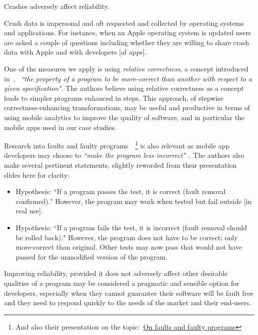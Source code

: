 Crashes adversely affect reliability.



Crash data is impersonal and oft requested and collected by operating systems and applications. For instance, when an Apple operating system is updated users are asked a couple of questions including whether they are willing to share crash data with Apple and with developers [of apps].

One of the measures we apply is using \emph{relative correctness}, a concept introduced in~\cite{diallo2015_correctness_and_relative_correctness}, ~\emph{``the
property of a program to be more-correct than another with respect to a given specification"}. The authors believe using relative correctness as a concept leads to simpler programs enhanced  in steps. This approach, of stepwise correctness-enhancing transformations, may be useful and productive in terms of using mobile analytics to improve the quality of software, and in particular the mobile apps used in our case studies. 

Research into faults and faulty programs~\cite{mili2014_on_faults_and_faulty_programs}~\footnote{And also their presentation on the topic:~\href{http://mathcs.chapman.edu/ramics2014/slides/MiliFriasJaouaRAMiCS2014.pdf}{On faults and faulty programs}} is also relevant as mobile app developers may choose to \emph{``make the program less incorrect"}~\cite{mili2014_on_faults_and_faulty_programs}. The authors also make several pertinent statements, slightly reworded from their presentation slides here for clarity:
\begin{itemize}
    \item Hypothesis: ``If a program passes the test, it is correct (fault removal confirmed)." However, the program may work when tested but fail outside [in real use].
    \item Hypothesis: ``If a program fails the test, it is incorrect (fault removal should be rolled back)." However, the program does not have to be correct; only more-correct than original. Other tests may now pass that would not have passed for the unmodified version of the program.
\end{itemize}

Improving reliability, provided it does not adversely affect other desirable qualities of a program may be considered a pragmatic and sensible option for developers, especially when they cannot guarantee their software will be fault free and they need to respond quickly to the needs of the market and their end-users.



